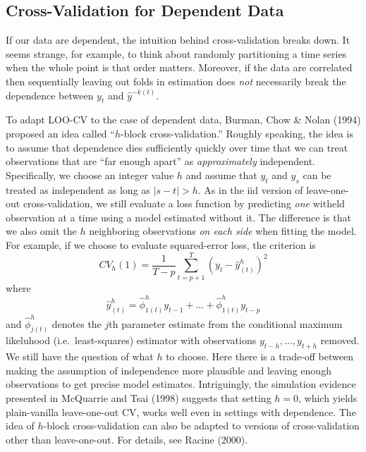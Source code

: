 \subsection{Cross-Validation for Dependent Data}
\label{sec:CVdependent}
If our data are dependent, the intuition behind cross-validation breaks down.
It seems strange, for example, to think about randomly partitioning a time series when the whole point is that order matters.
Moreover, if the data are correlated then sequentially leaving out folds in estimation does \emph{not} necessarily break the dependence between $y_t$  and $\widehat{y}^{-k(t)}$. 

To adapt LOO-CV to the case of dependent data, Burman, Chow \& Nolan (1994) proposed an idea called  ``$h$-block cross-validation.''
Roughly speaking, the idea is to assume that dependence dies sufficiently quickly over time that we can treat observations that are ``far enough apart'' as \emph{approximately} independent.
Specifically, we choose an integer value $h$ and assume that $y_t$ and $y_s$ can be treated as independent as long as $|s - t|>h$.
As in the iid version of leave-one-out cross-validation, we still evaluate a loss function by predicting \emph{one} witheld observation at a time using a model estimated without it.
The difference is that we also omit the $h$ neighboring observations \emph{on each side} when fitting the model.
For example, if we choose to evaluate squared-error loss, the criterion is
	$$CV_h(1) = \frac{1}{T-p}\sum_{t = p+1}^T \left(y_t - \hat{y}_{(t)}^h\right)^2$$
where 
$$\hat{y}^h_{(t)} = \hat{\phi}^h_{1(t)} y_{t-1} + \hdots + \hat{\phi}^h_{1(t)}y_{t-p}$$
and $\hat{\phi}^h_{j(t)}$ denotes the $j$th parameter estimate from the conditional maximum likeluhood (i.e.\ least-squares) estimator with observations $y_{t-h}, \hdots,  y_{t+h}$ removed.
We still have the question of what $h$ to choose. 
Here there is a trade-off between making the assumption of independence more plausible and leaving enough observations to get precise model estimates.
Intriguingly, the simulation evidence presented in McQuarrie and Tsai (1998) suggests that setting $h=0$, which yields plain-vanilla leave-one-out CV, works well even in settings with dependence.
The idea of $h$-block cross-validation can also be adapted to versions of cross-validation other than leave-one-out.
For details, see Racine (2000).

